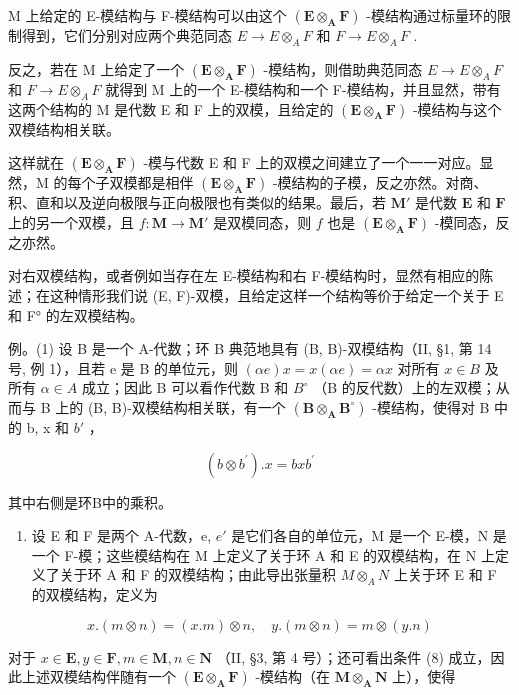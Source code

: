 M 上给定的 E-模结构与 F-模结构可以由这个 \((\mathbf{E} \otimes_{\mathbf{A}} \mathbf{F})\) -模结构通过标量环的限制得到，它们分别对应两个典范同态 \(E \to E \otimes_{A} F\) 和 \(F \to E \otimes_{A} F\) .

反之，若在 M 上给定了一个 \((\mathbf{E} \otimes_{\mathbf{A}} \mathbf{F})\) -模结构，则借助典范同态 \(E \to E \otimes_{A} F\) 和 \(F \to E \otimes_{A} F\) 就得到 M 上的一个 E-模结构和一个 F-模结构，并且显然，带有这两个结构的 M 是代数 E 和 F 上的双模，且给定的 \((\mathbf{E} \otimes_{\mathbf{A}} \mathbf{F})\) -模结构与这个双模结构相关联。

这样就在 \((\mathbf{E} \otimes_{\mathbf{A}} \mathbf{F})\) -模与代数 E 和 F 上的双模之间建立了一个一一对应。显然，M 的每个子双模都是相伴 \((\mathbf{E} \otimes_{\mathbf{A}} \mathbf{F})\) -模结构的子模，反之亦然。对商、积、直和以及逆向极限与正向极限也有类似的结果。最后，若 \(\mathbf{M}'\) 是代数 \(\mathbf{E}\) 和 \(\mathbf{F}\) 上的另一个双模，且 \(f\colon \mathbf{M}\to \mathbf{M}'\) 是双模同态，则 \(f\) 也是 \((\mathbf{E}\otimes_{\mathbf{A}}\mathbf{F})\) -模同态，反之亦然。

对右双模结构，或者例如当存在左 E-模结构和右 F-模结构时，显然有相应的陈述；在这种情形我们说 (E, F)-双模，且给定这样一个结构等价于给定一个关于 E 和 F° 的左双模结构。

例。(1) 设 B 是一个 A-代数；环 B 典范地具有 (B, B)-双模结构（II, §1, 第 14 号, 例 1），且若 e 是 B 的单位元，则 \((\alpha e)x = x(\alpha e) = \alpha x\) 对所有 \(x \in B\) 及所有 \(\alpha \in A\) 成立；因此 B 可以看作代数 B 和 \(B^{\circ}\) （B 的反代数）上的左双模；从而与 B 上的 (B, B)-双模结构相关联，有一个 \((\mathbf{B} \otimes_{\mathbf{A}} \mathbf{B}^{\circ})\) -模结构，使得对 B 中的 b, x 和 \(b'\) ，

\[
(b \otimes b ^ {\prime}). x = b x b ^ {\prime}\tag{9}
\]

其中右侧是环B中的乘积。

\begin{enumerate}
\def\labelenumi{(\arabic{enumi})}
\setcounter{enumi}{1}
\tightlist
\item
  设 E 和 F 是两个 A-代数，e, \(e'\) 是它们各自的单位元，M 是一个 E-模，N 是一个 F-模；这些模结构在 M 上定义了关于环 A 和 E 的双模结构，在 N 上定义了关于环 A 和 F 的双模结构；由此导出张量积 \(M \otimes_{A} N\) 上关于环 E 和 F 的双模结构，定义为
\end{enumerate}

\[
x. (m \otimes n) = (x. m) \otimes n, \quad y. (m \otimes n) = m \otimes (y. n)
\]

对于 \(x \in \mathbf{E}, y \in \mathbf{F}, m \in \mathbf{M}, n \in \mathbf{N}\) （II, §3, 第 4 号）；还可看出条件 (8) 成立，因此上述双模结构伴随有一个 \((\mathbf{E} \otimes_{\mathbf{A}} \mathbf{F})\) -模结构（在 \(\mathbf{M} \otimes_{\mathbf{A}} \mathbf{N}\) 上），使得

